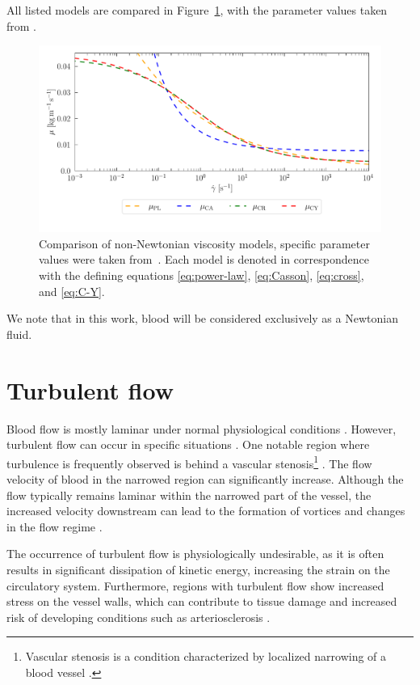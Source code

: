 All listed models are compared in Figure~\ref{fig:vs}, with the parameter values taken from \cite{Eichler2023}.
\begin{figure}[h]
	\centering
	\includegraphics[width=1.0\textwidth]{figures/modely.pdf}
	\vspace{-9mm}
	\caption{Comparison of non-Newtonian viscosity models, specific parameter values were taken from~\cite{Eichler2023}. Each model is denoted in correspondence with the defining equations
		\eqref{eq:power-law}, \eqref{eq:Casson}, \eqref{eq:cross}, and \eqref{eq:C-Y}.}
	\label{fig:vs}
\end{figure}
We note that in this work, blood will be considered exclusively as a Newtonian fluid.

\section*{\fontsize{11}{15}\selectfont Turbulent flow}
Blood flow is mostly laminar under normal physiological conditions \cite{Sequeira}. However, turbulent flow can occur in specific situations \cite{Saqr2020}. One notable region where turbulence is frequently observed is behind a vascular stenosis\footnote{Vascular stenosis is a condition characterized by localized narrowing of a blood vessel \cite{Carabello2009}.} \cite{Jain2022}. The flow velocity of blood in the narrowed region can significantly increase. Although the flow typically remains laminar within the narrowed part of the vessel, the increased velocity downstream can lead to the formation of vortices and changes in the flow regime \cite{Sequeira, Saloner2019, Varghese2003}.

The occurrence of turbulent flow is physiologically undesirable, as it is often results in significant dissipation of kinetic energy, increasing the strain on the circulatory system. Furthermore, regions with turbulent flow show increased stress on the vessel walls, which can contribute to tissue damage and increased risk of developing conditions such as arteriosclerosis \cite{Saloner2019, Kameneva2004}.